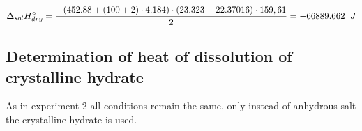 \documentclass[12pt, letterpaper]{article}
\begin{document}
        \begin{equation}
            \Delta_{sol}H^\circ_{dry} = \frac{-(452.88 + (100 + 2) \cdot 4.184) \cdot (23.323 - 22.37016) \cdot 159,61}{2} = -66889.662 \hspace{2 mm} J
        \end{equation}


        
       

        \subsection*{Determination of heat of dissolution of crystalline hydrate}
        \hspace{4mm} As in experiment 2 all conditions remain the same, only instead of anhydrous salt the crystalline hydrate is used.
\end{document}

